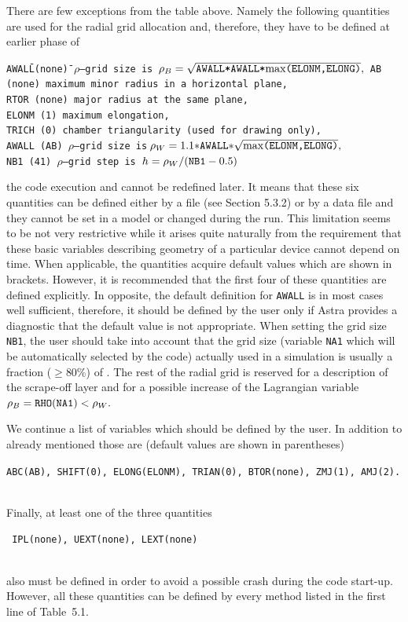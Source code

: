 There are few exceptions from the table above.
Namely the following quantities are used for the radial grid allocation
and, therefore, they have to be defined at earlier phase of 
\linebreak\vspace*{-20pt}
\begin{tabbing}
\indent	\tt AWALL\quad  \=\quad (none)\quad \= $\rho$--grid size is 
     $\rho_B=\sqrt{\mbox{\tt AWALL*AWALL*{\rm max}(ELONM,ELONG)}},$\kill
\indent	\tt AB	  	\>(none)
			\> maximum minor radius in a horizontal plane,\\
\indent	\tt RTOR  	\>(none)
			\> major radius at the same plane,	\\
\indent	\tt ELONM 	\>(1)	
			\> maximum elongation,			\\
\indent	\tt TRICH 	\>(0)	
			\> chamber triangularity (used for drawing
			   only),\\
\indent	\tt AWALL 	\>\tt (AB)
			\> $\rho$--grid size is 
     $\!\!\rho_W=1.1{\tt *AWALL*}\sqrt{\mbox{\rm max\tt(ELONM,ELONG)}},$\\
\indent	\tt NB1	  	\>(41)
		\> $\rho$--grid step is   $h=\rho_W/(\mbox{\tt NB1}-0.5)$
\end{tabbing}
\noindent
the code execution and cannot be redefined later. 
It means that these six quantities can be defined either by a
 file (see Section 5.3.2) or by a data file and 
they cannot be set in a model or changed during the run.
This limitation seems to be not very restrictive while it arises 
quite naturally from the requirement
that these basic variables describing geometry of a particular
device cannot depend on time. 
When applicable, the quantities acquire default values which are 
shown in brackets.
However, it is recommended that the first 
four of these quantities are defined explicitly. 
In opposite, the default definition for {\tt AWALL} is in most cases
well sufficient, therefore, it should be defined by the user only if 
Astra provides a diagnostic that the default value is not appropriate.
When setting the grid size {\tt NB1}, the user should take into account
that the grid size (variable {\tt NA1} which will be automatically
selected by the code) actually used in a simulation is usually a
fraction ($\geq$80\%) of . 
The rest of the radial grid is reserved for a description of the
scrape-off layer and for a possible increase of the Lagrangian variable
$\rho_B={\tt RHO(NA1)}<\rho_W.$ 

We continue a list of variables which should be defined by the user.
In addition to already mentioned  those are
(default values are shown in parentheses)
\\
\centerline
{\tt ABC(AB), SHIFT(0), ELONG(ELONM), TRIAN(0), BTOR{\rm(none)}, ZMJ(1),
AMJ(2).}
\\
Finally, at least one of the three quantities
\\
\centerline{\tt
IPL{\rm(none)}, UEXT{\rm (none)}, LEXT\rm(none)}
\\
also must be defined in order to avoid a possible crash during the code
start-up. 
However, all these quantities can be defined by every method listed in
the first line of Table~5.1.

